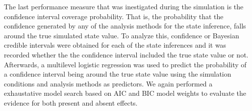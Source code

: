 The last performance measure that was inestigated during the simulation 
is the confidence interval coverage probability. That is, the probability that 
the confidence generated by any of the analysis methods for the state inference, 
falls around the true simulated state value. To analyze this, confidence or Bayesian 
credible intervals were obtained for each of the state inferences and it was 
recorded whether the the confidence interval included the true state value or not. 
Afterwards, a multilevel logistic regression was used to predict the probability 
of a confidence interval being around the true state value using the simulation 
conditions and analysis methods as predictors. We again performed a exhaustative
model search based on AIC and BIC model weights to evaluate the evidence for both 
present and absent effects. 